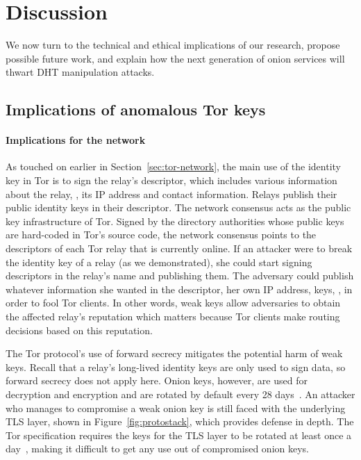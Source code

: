 \section{Discussion}
\label{sec:discussion}
We now turn to the technical and ethical implications of our research, propose
possible future work, and explain how the next generation of onion
services will thwart DHT manipulation attacks.

\subsection{Implications of anomalous Tor keys}
\paragraph{Implications for the network}
As touched on earlier in Section~\ref{sec:tor-network}, the main use of the
identity key in Tor is to sign the relay's descriptor, which includes various
information about the relay, \eg, its IP address and contact information.
Relays publish their public identity keys in their descriptor.  The network
consensus acts as the public key infrastructure of Tor.  Signed by the directory
authorities whose public keys are hard-coded in Tor's source code, the network
consensus points to the descriptors of each Tor relay that is currently online.
If an attacker were to break the identity key of a relay (as we demonstrated),
she could start signing descriptors in the relay's name and publishing them. The
adversary could publish whatever information she wanted in the descriptor, \eg
her own IP address, keys, \etc, in order to fool Tor clients.  In other words,
weak keys allow adversaries to obtain the affected relay's reputation which
matters because Tor clients make routing decisions based on this reputation.

The Tor protocol's use of forward secrecy mitigates the potential harm of weak
keys.  Recall that a relay's long-lived identity keys are only used to sign
data, so forward secrecy does not apply here.  Onion keys, however, are used for
decryption and encryption and are rotated by default every 28
days~\cite[\S~3.4.1]{dir-spec}.  An attacker who manages to compromise a weak
onion key is still faced with the underlying TLS layer, shown in
Figure~\ref{fig:protostack}, which provides defense in depth.  The Tor
specification requires the keys for the TLS layer to be rotated at least once a
day~\cite[\S~1.1]{torspec}, making it difficult to get any use out of
compromised onion keys.

